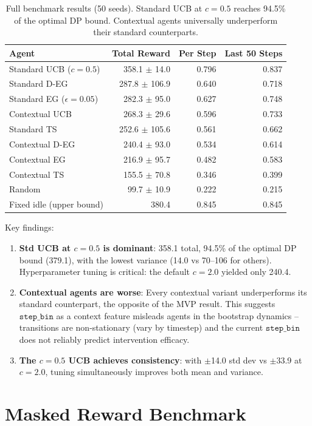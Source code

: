 \documentclass[11pt]{article}
\begin{document}
\begin{table}[h]
\centering
\begin{tabular}{lrrr}
\toprule
Agent & Total Reward & Per Step & Last 50 Steps \\
\midrule
Standard UCB ($c=0.5$) & 358.1 $\pm$ 14.0 & 0.796 & 0.837 \\
Standard D-EG & 287.8 $\pm$ 106.9 & 0.640 & 0.718 \\
Standard EG ($\epsilon=0.05$) & 282.3 $\pm$ 95.0 & 0.627 & 0.748 \\
Contextual UCB & 268.3 $\pm$ 29.6 & 0.596 & 0.733 \\
Standard TS & 252.6 $\pm$ 105.6 & 0.561 & 0.662 \\
Contextual D-EG & 240.4 $\pm$ 93.0 & 0.534 & 0.614 \\
Contextual EG & 216.9 $\pm$ 95.7 & 0.482 & 0.583 \\
Contextual TS & 155.5 $\pm$ 70.8 & 0.346 & 0.399 \\
Random & 99.7 $\pm$ 10.9 & 0.222 & 0.215 \\
\midrule
Fixed idle (upper bound) & 380.4 & 0.845 & 0.845 \\
\bottomrule
\end{tabular}
\caption{Full benchmark results (50 seeds). Standard UCB at $c=0.5$ reaches 94.5\% of the optimal DP bound. Contextual agents universally underperform their standard counterparts.}
\end{table}

Key findings:
\begin{enumerate}
  \item \textbf{Std UCB at $c=0.5$ is dominant}: 358.1 total, 94.5\% of the optimal DP bound (379.1), with the lowest variance (14.0 vs 70--106 for others). Hyperparameter tuning is critical: the default $c=2.0$ yielded only 240.4.
  \item \textbf{Contextual agents are worse}: Every contextual variant underperforms its standard counterpart, the opposite of the MVP result. This suggests $\texttt{step\_bin}$ as a context feature misleads agents in the bootstrap dynamics -- transitions are non-stationary (vary by timestep) and the current $\texttt{step\_bin}$ does not reliably predict intervention efficacy.
  \item \textbf{The $c=0.5$ UCB achieves consistency}: with $\pm$14.0 std dev vs $\pm$33.9 at $c=2.0$, tuning simultaneously improves both mean and variance.
\end{enumerate}

\section{Masked Reward Benchmark}
\end{document}
